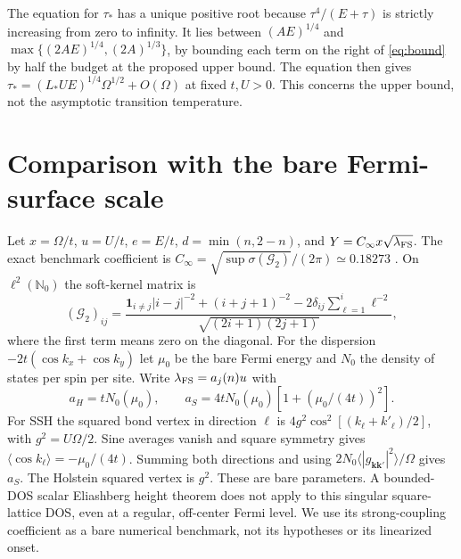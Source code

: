 \documentclass[11pt]{article}
\begin{document}
The equation for $\tau_*$ has a unique positive root because $\tau^4/(E+\tau)$ is strictly increasing from zero to infinity. It lies between $(AE)^{1/4}$ and $\max\{(2AE)^{1/4},(2A)^{1/3}\}$, by bounding each term on the right of \eqref{eq:bound} by half the budget at the proposed upper bound. The equation then gives $\tau_*=(L_*UE)^{1/4}\Omega^{1/2}+O(\Omega)$ at fixed $t,U>0$. This concerns the upper bound, not the asymptotic transition temperature.

\section{Comparison with the bare Fermi-surface scale}
Let $x=\Omega/t$, $u=U/t$, $e=E/t$, $d=\min(n,2-n)$, and $Y=C_\infty x\sqrt{\lambda_{\rm FS}}$. The exact benchmark coefficient is $C_\infty=\sqrt{\sup\sigma(\mathcal G_2)}/(2\pi)\simeq0.18273$ \cite{kaygamma,kay}. On $\ell^2(\mathbb N_0)$ the soft-kernel matrix is
\[
 (\mathcal G_2)_{ij}=
 \frac{\mathbf1_{i\ne j}|i-j|^{-2}+(i+j+1)^{-2}
 -2\delta_{ij}\sum_{\ell=1}^{i}\ell^{-2}}{\sqrt{(2i+1)(2j+1)}} ,
\]
where the first term means zero on the diagonal. For the dispersion $-2t(\cos k_x+\cos k_y)$ let $\mu_0$ be the bare Fermi energy and $N_0$ the density of states per spin per site. Write $\lambda_{\rm FS}=a_j(n)u$ with
\[
 a_H=tN_0(\mu_0),\qquad
 a_S=4tN_0(\mu_0)\left[1+\left(\mu_0/(4t)\right)^2\right].
\]
For SSH the squared bond vertex in direction $\ell$ is $4g^2\cos^2[(k_\ell+k'_\ell)/2]$, with $g^2=U\Omega/2$. Sine averages vanish and square symmetry gives $\langle\cos k_\ell\rangle=-\mu_0/(4t)$. Summing both directions and using $2N_0\langle |g_{\mathbf k\mathbf k'}|^2\rangle/\Omega$ gives $a_S$. The Holstein squared vertex is $g^2$. These are bare parameters. A bounded-DOS scalar Eliashberg height theorem does not apply to this singular square-lattice DOS, even at a regular, off-center Fermi level. We use its strong-coupling coefficient as a bare numerical benchmark, not its hypotheses or its linearized onset.
\end{document}
